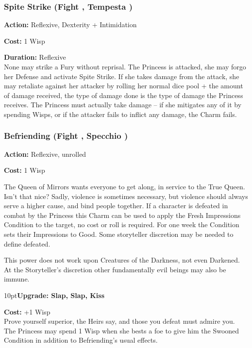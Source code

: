 \subsubsection*{Spite Strike (Fight \textbullet\textbullet, Tempesta \textbullet)}

\noindent \textbf{Action:} Reflexive, Dexterity + Intimidation

\noindent \textbf{Cost:} 1 Wisp

\noindent \textbf{Duration:} Reflexive\\

\noindent None may strike a Fury without reprisal. The Princess is attacked, she may forgo her Defense and activate Spite Strike. If she takes damage from the attack, she may retaliate against her attacker by rolling her normal dice pool + the amount of damage received, the type of damage done is the type of damage the Princess receives. The Princess must actually take damage -- if she mitigates any of it by spending Wisps, or if the attacker fails to inflict any damage, the Charm fails.

\subsubsection*{Befriending (Fight \textbullet\textbullet, Specchio \textbullet\textbullet)}

\noindent \textbf{Action:} Reflexive, unrolled

\noindent \textbf{Cost:} 1 Wisp

\noindent The Queen of Mirrors wants everyone to get along, in service to the True Queen. Isn't that nice? Sadly, violence is sometimes necessary, but violence should always serve a higher cause, and bind people together. If a character is defeated in combat by the Princess this Charm can be used to apply the Fresh Impressions Condition to the target, no cost or roll is required. For one week the Condition sets their Impressions to Good. Some storyteller discretion may be needed to define defeated.

This power does not work upon Creatures of the Darkness, not even Darkened. At the Storyteller's discretion other fundamentally evil beings may also be immune. 

\begin{myindentpar}{10pt}\textbf{Upgrade: Slap, Slap, Kiss}

\textbf{Cost:} +1 Wisp\\

\noindent Prove yourself superior, the Heirs say, and those you defeat must admire you. The Princess may spend 1 Wisp when she bests a foe to give him the Swooned Condition in addition to Befriending's usual effects. \end{myindentpar}

